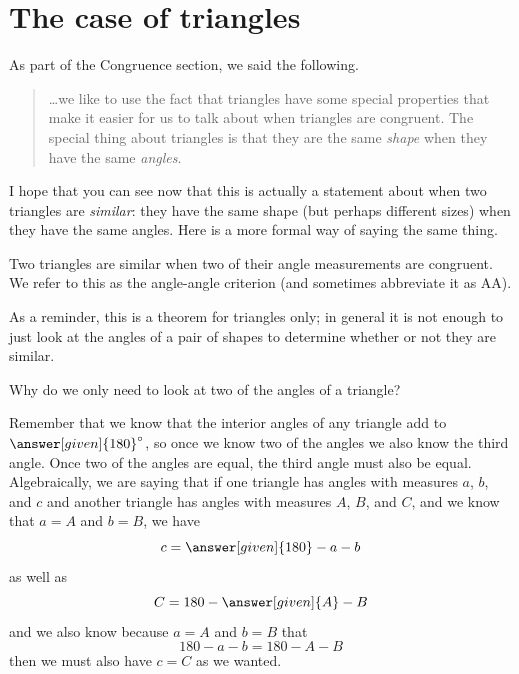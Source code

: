 \documentclass{ximera}
\begin{document}
\section{The case of triangles}
As part of the Congruence section, we said the following. 
\begin{quote}
\dots we like to use the fact that triangles have some special properties that make it easier for us to talk about when triangles are congruent. The special thing about triangles is that they are the same \emph{shape} when they have the same \emph{angles}.
\end{quote}
I hope that you can see now that this is actually a statement about when two triangles are \emph{similar}: they have the same shape (but perhaps different sizes) when they have the same angles. Here is a more formal way of saying the same thing.
\begin{theorem}
Two triangles are similar when two of their angle measurements are congruent. We refer to this as the angle-angle criterion (and sometimes abbreviate it as AA). %
\end{theorem}
As a reminder, this is a theorem for triangles only; in general it is not enough to just look at the angles of a pair of shapes to determine whether or not they are similar. 
\begin{question}
Why do we only need to look at two of the angles of a triangle? 
\begin{explanation} 
Remember that we know that the interior angles of any triangle add to $\answer[given]{180}\degree$, so once we know two of the angles we also know the third angle. Once two of the angles are equal, the third angle must also be equal. Algebraically, we are saying that if one triangle has angles with measures $a$, $b$, and $c$ and another triangle has angles with measures $A$, $B$, and $C$, and we know that $a=A$ and $b=B$, we have
\[
c = \answer[given]{180} - a - b
\]
as well as
\[
C = 180 - \answer[given]{A} - B
\]
and we also know because $a=A$ and $b=B$ that
\[
180 - a - b = 180 - A - B
\]
then we must also have $c=C$ as we wanted.
\end{explanation}
\end{question}
\end{document}

